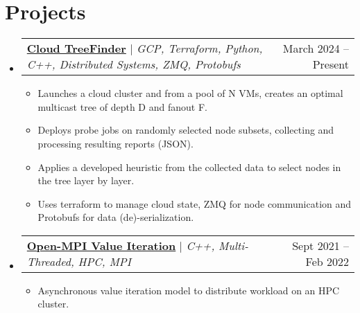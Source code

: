 \documentclass[letterpaper,11pt]{article}
\makeatletter
\newcommand{\resumeItem}[1]{
  \item\small{
    {#1 \vspace{-2pt}}
  }
}
\newcommand{\resumeProjectHeading}[2]{
    \item
    \begin{tabular*}{0.97\textwidth}{l@{\extracolsep{\fill}}r}
      \small#1 & #2 \\
    \end{tabular*}\vspace{-7pt}
}
\newcommand{\resumeSubHeadingListStart}{\begin{itemize}[leftmargin=0.15in, label={}]}
\newcommand{\resumeSubHeadingListEnd}{\end{itemize}}
\newcommand{\resumeItemListStart}{\begin{itemize}}
\newcommand{\resumeItemListEnd}{\end{itemize}\vspace{-5pt}}
\makeatother
\begin{document}
\section{Projects}
    \resumeSubHeadingListStart
        \resumeProjectHeading
            {\href{https://github.com/duclos-cavalcanti/master-arbeit}{\textbf{Cloud TreeFinder}} $|$ \emph{GCP, Terraform, Python, C++, Distributed Systems, ZMQ, Protobufs}}{\small{March 2024 -- Present}}
            \resumeItemListStart
              \resumeItem{Launches a cloud cluster and from a pool of N VMs, creates an optimal multicast tree of depth D and fanout F.}
              \resumeItem{Deploys probe jobs on randomly selected node subsets, collecting and processing resulting reports (JSON). }
              \resumeItem{Applies a developed heuristic from the collected data to select nodes in the tree layer by layer. }
              \resumeItem{Uses terraform to manage cloud state, ZMQ for node communication and Protobufs for data (de)-serialization.}
            \resumeItemListEnd
        \resumeProjectHeading
            {\href{https://github.com/duclos-cavalcanti/Open-MPI-ValueIteration}{\textbf{Open-MPI Value Iteration}} $|$ \emph{C++, Multi-Threaded, HPC, MPI}}{\small{Sept 2021 -- Feb 2022}}
            \resumeItemListStart
              \resumeItem{Asynchronous value iteration model to distribute workload on an HPC cluster.}
            \resumeItemListEnd

    \resumeSubHeadingListEnd
\end{document}
